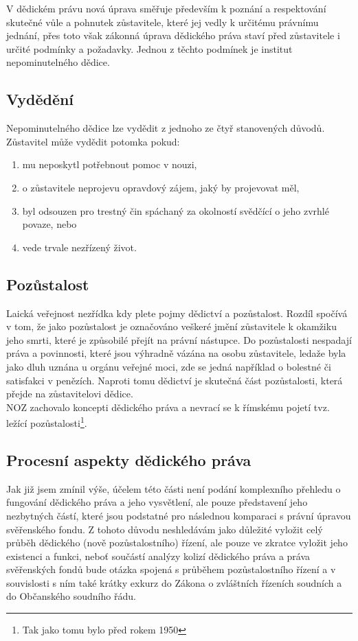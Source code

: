 \documentclass{article}
\begin{document}
V dědickém právu nová úprava směřuje především k poznání a respektování skutečné vůle a pohnutek zůstavitele, které jej vedly k určitému právnímu jednání, přes toto však zákonná úprava dědického práva staví před zůstavitele i určité podmínky a požadavky. Jednou z těchto podmínek je institut nepominutelného dědice.

\subsection{Vydědění}

Nepominutelného dědice lze vydědit z jednoho ze čtyř stanovených důvodů. Zůstavitel může vydědit potomka pokud:

\begin{enumerate}
\item mu neposkytl potřebnout pomoc v nouzi,
\item o zůstavitele neprojevu opravdový zájem, jaký by projevovat měl,
\item byl odsouzen pro trestný čin spáchaný za okolností svědčící o jeho zvrhlé povaze, nebo
\item vede trvale nezřízený život.
\end{enumerate}

\subsection{Pozůstalost}

Laická veřejnost nezřídka kdy plete pojmy dědictví a pozůstalost. Rozdíl spočívá v tom, že jako pozůstalost je označováno veškeré jmění zůstavitele k okamžiku jeho smrti, které je způsobilé přejít na právní nástupce. Do pozůstalosti nespadají práva a povinnosti, které jsou výhradně vázána na osobu zůstavitele, ledaže byla jako dluh uznána u orgánu veřejné moci, zde se jedná například o bolestné či satisfakci v penězích. Naproti tomu dědictví je skutečná část pozůstalosti, která přejde na zůstavitelovi dědice.\\

NOZ zachovalo koncepti dědického práva a nevrací se k římskému pojetí tvz. ležící pozůstalosti\footnote{Tak jako tomu bylo před rokem 1950}.

\subsection{Procesní aspekty dědického práva}

Jak již jsem zmínil výše, účelem této části není podání komplexního přehledu o fungování dědického práva a jeho vysvětlení, ale pouze představení jeho nezbytných částí, které jsou podstatné pro následnou komparaci s právní úpravou svěřenského fondu. Z tohoto důvodu neshledávám jako důležité vyložit celý průběh dědického (nově pozůstalostního) řízení, ale pouze ve zkratce vyložit jeho existenci a funkci, neboť součástí analýzy kolizí dědického práva a práva svěřenských fondů bude otázka spojená s průběhem pozůstalostního řízení a v souvislosti s ním také krátky exkurz do Zákona o zvláštních řízeních soudních a do Občanského soudního řádu.\\
\end{document}
